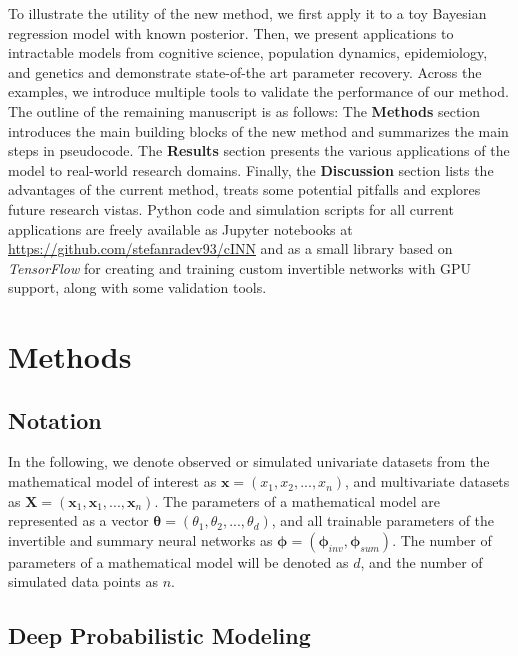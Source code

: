 \documentclass[9pt,twoside,lineno]{pnas-new}
\begin{document}
To illustrate the utility of the new method, we first apply it to a toy Bayesian regression model with known posterior. Then, we present applications to intractable models from cognitive science, population dynamics, epidemiology, and genetics and demonstrate state-of-the art parameter recovery. Across the examples, we introduce multiple tools to validate the performance of our method. The outline of the remaining manuscript is as follows: The \textbf{Methods} section introduces the main building blocks of the new method and summarizes the main steps in pseudocode. The \textbf{Results} section presents the various applications of the model to real-world research domains. Finally, the \textbf{Discussion} section lists the advantages of the current method, treats some potential pitfalls and explores future research vistas. Python code and simulation scripts for all current applications are freely available as Jupyter notebooks at \href{https://github.com/stefanradev93/cINN}{https://github.com/stefanradev93/cINN} and as a small library based on \textit{TensorFlow} \cite{abadi2016tensorflow} for creating and training custom invertible networks with GPU support, along with some validation tools. 

\section*{Methods}

\subsection*{Notation}

In the following, we denote observed or simulated univariate datasets from the mathematical model of interest as $\boldsymbol{x} = (x_{1}, x_{2},...,x_{n})$, and multivariate datasets as $\boldsymbol{X} = (\boldsymbol{x}_{1}, \boldsymbol{x}_{1},...,\boldsymbol{x}_{n})$. The parameters of a mathematical model are represented as a vector $\boldsymbol{\theta} = (\theta_{1}, \theta_{2},...,\theta_{d})$, and all trainable parameters of the invertible and summary neural networks as $\boldsymbol{\phi} = (\boldsymbol{\phi}_{inv}, \boldsymbol{\phi}_{sum})$. The number of parameters of a mathematical model will be denoted as $d$, and the number of simulated data points as $n$.

\subsection*{Deep Probabilistic Modeling}
\end{document}
